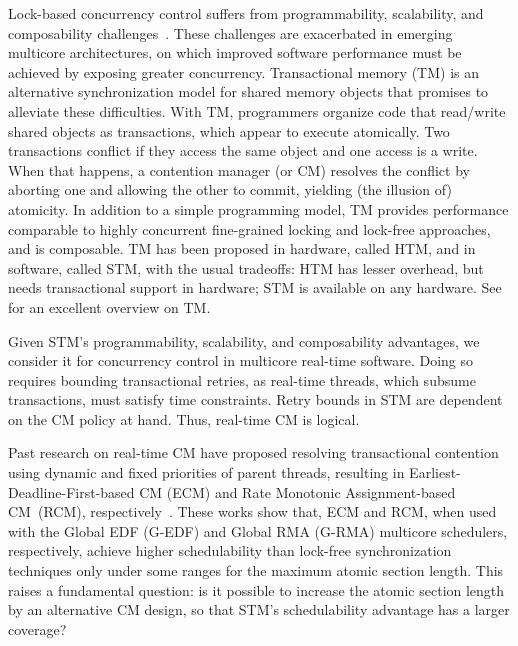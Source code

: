 \documentclass{sig-alternate}
\begin{document}
\label{sec:intro}

Lock-based concurrency control suffers from programmability, scalability, and composability challenges~\cite{Herlihy:2006:AMP:1146381.1146382}. These challenges are exacerbated in emerging multicore architectures, on which improved software performance must be achieved by exposing greater concurrency.  Transactional memory (TM) is an alternative synchronization model for shared memory objects that promises to alleviate these difficulties.  With TM, programmers organize code that read/write shared objects as transactions, which appear to execute atomically. Two transactions conflict if they access the same object and one access is a write. When that happens, a contention manager (or CM)
resolves the conflict by aborting one and allowing the other to commit, yielding (the illusion of) atomicity. 
In addition to a simple programming model, TM provides performance comparable to highly concurrent fine-grained locking and lock-free approaches,  
and is composable. 
TM has been proposed in hardware, called HTM,  
and in software, called STM,  
with the usual tradeoffs: HTM has lesser overhead, but needs transactional support in hardware; STM is available on any hardware. See~\cite{tm-book10} for an excellent overview on TM.


Given STM's programmability, scalability, and composability advantages, we consider it for concurrency control in multicore real-time software. Doing so requires bounding transactional  retries, as real-time threads, which subsume transactions, must satisfy time constraints.  Retry bounds in STM are dependent on the CM policy at hand. Thus, real-time CM is logical.

Past research on real-time CM have proposed resolving transactional contention using dynamic and fixed priorities of parent threads, resulting in Earliest-Deadline-First-based CM (ECM) and Rate Monotonic Assignment-based CM~(RCM), respectively~\cite{fahmy2009bounding,fahmy2009response,stmconcurrencycontrol:emsoft11}.
These works show that, ECM and RCM, when used with the Global EDF (G-EDF) and Global RMA  (G-RMA) multicore schedulers, respectively, achieve higher schedulability than lock-free synchronization techniques only under some ranges for the maximum atomic section length. This raises a fundamental question: is it possible to increase the atomic section length by an alternative CM design, so that STM's schedulability advantage has a larger coverage? 
\end{document}
